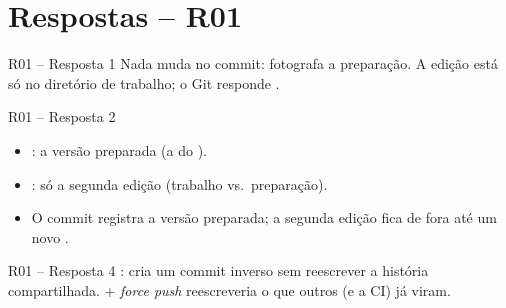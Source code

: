 \section[Resp. R01]{Respostas -- R01}

\begin{frame}[label=r01-resp1]{R01 -- Resposta 1}
  Nada muda no commit:  fotografa a \alert{preparação}.
  A edição está só no diretório de trabalho; o Git responde
  .
  \vfill
  \voltar
\end{frame}

\begin{frame}[label=r01-resp2]{R01 -- Resposta 2}
  \begin{itemize}
    \item {}: a versão \alert{preparada} (a do ).
    \item {}: só a \alert{segunda} edição (trabalho vs.\ preparação).
    \item O commit registra a versão preparada; a segunda edição fica de fora
      até um novo .
  \end{itemize}
  \vfill
  \voltar
\end{frame}

\begin{frame}[label=r01-resp4]{R01 -- Resposta 4}
  : cria um commit \alert{inverso} sem reescrever a
  história compartilhada.  + \emph{force push} reescreveria o que
  outros (e a CI) já viram.
  \vfill
  \voltar
\end{frame}
